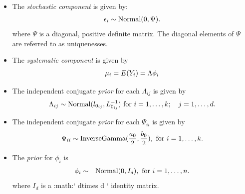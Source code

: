\documentclass[letterpaper,10pt,english]{sphinxmanual}
\begin{document}
\begin{itemize}
\item {} 
The \emph{stochastic component} is given by:
\begin{gather}
\begin{split}\begin{aligned}
\epsilon_{i}  \sim \textrm{Normal}(0, \Psi).\end{aligned}\end{split}\notag
\end{gather}
where \(\Psi\) is a diagonal, positive definite matrix. The
diagonal elements of \(\Psi\) are referred to as uniquenesses.

\item {} 
The \emph{systematic component} is given by
\begin{gather}
\begin{split}\begin{aligned}
\mu_i = E(Y_i) = \Lambda\phi_i\end{aligned}\end{split}\notag
\end{gather}
\item {} 
The independent conjugate \emph{prior} for each \(\Lambda_{ij}\) is
given by
\begin{gather}
\begin{split}\begin{aligned}
\Lambda_{ij} \sim \textrm{Normal}(l_{0_{ij}}, L_{0_{ij}}^{-1})
\textrm{ for } i=1,\ldots, k; \quad j=1,\ldots, d. \end{aligned}\end{split}\notag
\end{gather}
\item {} 
The independent conjugate \emph{prior} for each \(\Psi_{ii}\) is given
by
\begin{gather}
\begin{split}\begin{aligned}
\Psi_{ii} \sim \textrm{InverseGamma}(\frac{a_0}{2}, \frac{b_0}{2}), \textrm{ for }
i = 1, \ldots, k.\end{aligned}\end{split}\notag
\end{gather}
\item {} 
The \emph{prior} for \(\phi_i\) is
\begin{gather}
\begin{split}\begin{aligned}
\phi_i &\sim& \textrm{Normal}(0, I_d), \textrm{ for } i = 1, \ldots, n.\end{aligned}\end{split}\notag
\end{gather}
where \(I_d\) is a :math:{}` dtimes d {}` identity matrix.

\end{itemize}
\end{document}
